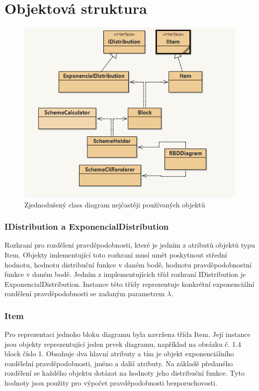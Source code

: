\documentclass[FM,RP]{tulthesis}
\begin{document}
    \section*{Objektová struktura}
        \begin{figure}[h]
        \centering
        \includegraphics[scale=0.85]{pic/class.png}
        \caption{Zjednodušený class diagram nejčastěji používaných objektů} 
    \end{figure}
        \subsubsection*{IDistribution a ExponencialDistribution}
            Rozhraní pro rozdělení pravděpodobnosti, které je jedním z atributů objektů typu Item.
            Objekty imlementující toto rozhraní musí umět poskytnout střední hodnotu, hodnotu distribuční funkce v daném bodě, hodnotu pravděpodobnostní funkce v daném bodě.
            Jedním z implementujících tříd rozhraní IDistribution je ExponencialDistribution. Instance této třídy reprezentuje konkrétní exponenciální 
            rozdělení pravděpodobnosti se zadaným parametrem $ \lambda $.
        \subsubsection*{Item}
            Pro reprezentaci jednoho bloku diagramu byla navržena třída Item. Její instance jsou objekty reprezentující jeden prvek diagramu, například na obrázku č. 1.4 block číslo 1. 
            Obsahuje dva hlavní atributy a tím je objekt exponenciálního rozdělelní pravděpodobnosti, jméno a další atributy.
            Na základě předaného rozdělení se každého objektu dotázat na hodnoty jeho distribuční funkce. Tyto hodnoty jsou použity pro výpočet pravděpodobnosti bezporuchovosti.
\end{document}

